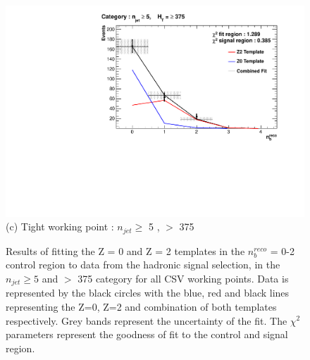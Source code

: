 \begin{figure}[ht]
\begin{minipage}[b]{0.51\linewidth}
\centering
\includegraphics[width = 1.0\linewidth]{plots/TemplatesSignal/Final_Fit_To_Data_Normal_Tight_HTBin_Template_375_jet_mult_5.pdf}
\centering (c) Tight working point :  $n_{jet} \geq$ 5 , \theht $>$ 375 
\end{minipage}
\caption[Results of fitting the Z = 0 and Z = 2 templates in the $n_{b}^{reco}$ = 0-2 control region to data from the hadronic signal selection, in the $n_{jet} \geq 5$ and \theht $>$ 375 category for all \ac{CSV} working points.]{Results of fitting the Z = 0 and Z = 2 templates in the $n_{b}^{reco}$ = 0-2 control region to data from the hadronic signal selection, in the $n_{jet} \geq 5$ and \theht $>$ 375 category for all \ac{CSV} working points. Data is represented by the black circles with the blue, red and black lines representing the Z=0, Z=2 and combination of both templates respectively. Grey bands represent the uncertainty of the fit. The $\chi^{2}$ parameters represent the goodness of fit to the control and signal region.}
\label{fig:template_data_signal_njet5}
\end{figure}

